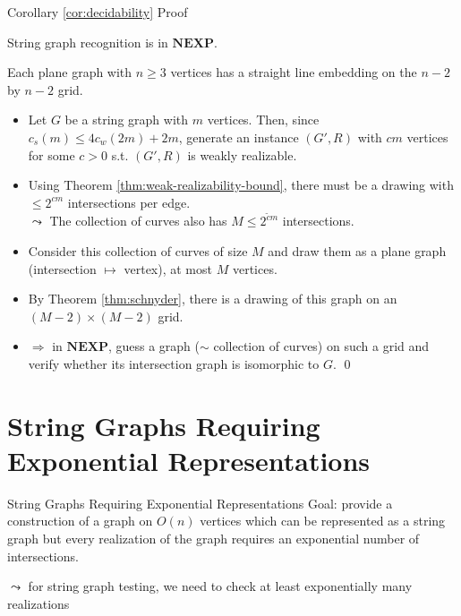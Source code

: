 \documentclass[10pt,aspectratio=169]{beamer}
\theoremstyle{plain}
\begin{document}
\addtocounter{theorem}{-2}
\begin{frame}[t]{Corollary \ref{cor:decidability} Proof}
    \begin{corollary}
        String graph recognition is in \(\mathbf{NEXP}\).
    \end{corollary}
    \begin{theorem}
        Each plane graph with \(n \geq 3\) vertices has a straight line embedding on the \(n-2\) by \(n-2\) grid.
        \label{thm:schnyder}
    \end{theorem}
    \begin{itemize}
        \item Let \(G\) be a string graph with \(m\) vertices. \pause
        Then, since \(c_s(m) \leq 4 c_w(2m) + 2m\), generate an instance \((G', R)\) with \(c m\) vertices for some \(c > 0\) s.t.
        \((G', R)\) is weakly realizable.
        \item<3-> Using Theorem \ref{thm:weak-realizability-bound}, there must be a drawing with \(\leq 2^{cm}\) intersections per edge.\\
        \(\leadsto\) The collection of curves also has \(M \leq 2^{\tilde{c} m}\) intersections.
        \item<4-> Consider this collection of curves of size \(M\) and draw them as a plane graph \\(intersection \(\mapsto\) vertex), at most \(M\) vertices.
        \item<5-> By Theorem \ref{thm:schnyder}, there is a drawing of this graph on an \((M-2) \times (M-2)\) grid.
        \item<6-> \(\Rightarrow\) in \(\mathbf{NEXP}\), guess a graph (\(\sim\) collection of curves) on such a grid and verify whether its intersection graph is isomorphic to \(G\). \qed
    \end{itemize}
\end{frame}

\section{String Graphs Requiring Exponential Representations \cite{kra91a}}

\begin{frame}{String Graphs Requiring Exponential Representations}
    Goal: provide a construction of a graph on \(O(n)\) vertices which can be represented
    as a string graph but every realization of the graph requires an exponential number of intersections.

    \(\leadsto\) for string graph testing, we need to check at least exponentially many realizations
\end{frame}
\end{document}
